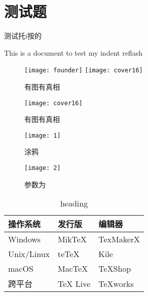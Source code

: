 \chapter{测试题}
测试托i按的

This is a document to test my indent reflash


\begin{figure}[htbp]
     \centering
     \texttt{[image: founder]}
     \hspace*{2cm}
     \texttt{[image: cover16]}
     \caption{有图有真相}
     \label{fig:myphoto}
\end{figure}

\begin{figure}[htbp]
     \centering
     \texttt{[image: cover16]}
     \caption{有图有真相}
     \label{fig:myphoto}
\end{figure}






     \begin{figure}[htbp]
         \centering
         \begin{minipage}{0.45\textwidth}
             \centering
             \texttt{[image: 1]}
             \caption{涂鸦}
             \label{fig2}
         \end{minipage}
         \begin{minipage}{0.45\textwidth}
             \centering
             \texttt{[image: 2]}
             \caption{参数为}
             \label{fig3}
         \end{minipage}
     \end{figure}





     \begin{table}[htbp]
          \renewcommand{\arraystretch}{1.5}
          \centering
          \caption{heading}
          \begin{tabular}{|>{\centering\arraybackslash}p{5cm}|p{3cm}|p{2cm}|}
               \hline
               操作系统& 发行版& 编辑器\\
               \hline
               Windows & MikTeX & TexMakerX \\
               Unix/Linux & teTeX & Kile \\
               macOS & MacTeX & TeXShop \\
               跨平台& TeX Live & TeXworks \\
               \hline
          \end{tabular}
     \end{table}


